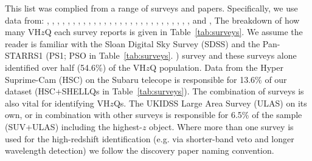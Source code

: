 \documentclass[usenatbib]{mnras}
\begin{document}
This list was complied from a range of surveys and papers. 
Specifically, we use data from: 
\citet{Banados2014, Banados2016, Banados2018}, 
\citet{Becker2015}, 
\citet{Calura2014}, 
\citet{Carilli2007, Carilli2010}, 
\citet{Carnall2015}, 
\citet{Cool2006}, 
\citet{DeRosa2011}, 
\citet{Fan2000, Fan2001c, Fan2003, Fan2004, Fan2006, Fan2018}, 
\citet{Goto2006}, 
\citet{Ikeda2017}, 
\citet{Jiang2008, Jiang2009, Jiang2015},  
\citet{Kashikawa2015}, 
\citet{Koptelova2017}, 
\citet{Kim2015, Kim2018},  
\citet{Kurk2007, Kurk2009}, 
\citet{Leipski2014}, 
\citet{Mahabal2005}, 
\citet{Matsuoka2016,  Matsuoka2018a, Matsuoka2018b},   
\citet{Mazzucchelli2017}, 
\citet{Morganson2012}, 
\citet{Mortlock2009, Mortlock2011},
\citet{McGreer2006, McGreer2013},  
\citet{Reed2015, Reed2017}, 
\citet{Stern2007},  
\citet{Tang2017}, 
\citet{Venemans2007, Venemans2012, Venemans2013, Venemans2015a, Venemans2015b, Venemans2016},
\citet{WangF2016, WangF2017, WangF2018a, WangF2018b},
\citet{Willott2007, Willott2009, Willott2010a, Willott2013b, Willott2015}, 
\citet{Wu2015} 
\citet{YangJ2018a, YangJ2018b}  
and 
\citet{Zeimann2011}, 
The breakdown of how many VH$z$Q each survey reports is given in
Table~\ref{tab:surveys}. We assume the reader is familiar with the
Sloan Digital Sky Survey (SDSS) and the Pan-STARRS1 (PS1; PSO in
Table~\ref{tab:surveys}.  ) survey and these surveys alone identified
over half (54.6\%) of the VH$z$Q population. Data from the
Hyper Suprime-Cam (HSC) on the Subaru telecope is responsible for
13.6\% of our dataset (HSC+SHELLQs in Table~\ref{tab:surveys}). The
combination of surveys is also vital for identifying VH$z$Qs. The
UKIDSS Large Area Survey (ULAS) on its own, or in combination with
other surveys is responsible for 6.5\% of the sample (SUV+ULAS)
including the highest-$z$ object. Where more than one survey is used
for the high-redshift identification (e.g. via shorter-band veto and
longer wavelength detection) we follow the discovery paper naming
convention.
\end{document}
